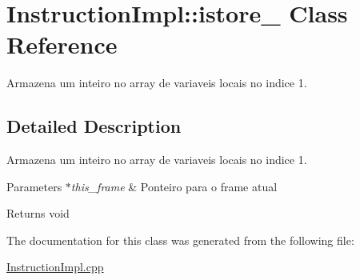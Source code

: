 \hypertarget{class_instruction_impl_1_1istore__1}{}\section{Instruction\+Impl\+:\+:istore\+\_ Class Reference}
\label{class_instruction_impl_1_1istore__1}


Armazena um inteiro no array de variaveis locais no indice 1.  




\subsection{Detailed Description}
Armazena um inteiro no array de variaveis locais no indice 1. 


\begin{DoxyParams}{Parameters}
{\em $\ast$this\+\_\+frame} & Ponteiro para o frame atual \\
\hline
\end{DoxyParams}
\begin{DoxyReturn}{Returns}
void 
\end{DoxyReturn}


The documentation for this class was generated from the following file\+:\begin{DoxyCompactItemize}
\item 
\hyperlink{_instruction_impl_8cpp}{Instruction\+Impl.\+cpp}\end{DoxyCompactItemize}
